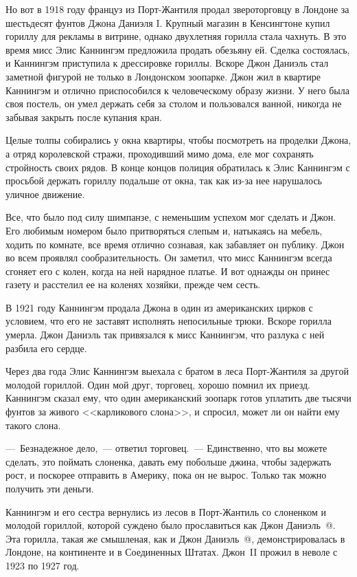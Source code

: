 \documentclass[12pt,a4paper,twoside,openany,svgnames]{memoir}
\makeatletter
\newcommand*{\rom}[1]{\expandafter\@slowromancap\romannumeral #1@}
\makeatother
\begin{document}
Но вот в 1918 году француз из Порт-Жантиля продал звероторговцу в Лондоне за шестьдесят фунтов Джона Даниэля I. Крупный магазин в Кенсингтоне купил гориллу для рекламы в витрине, однако двухлетняя горилла стала чахнуть. В это время мисс Элис Каннингэм предложила продать обезьяну ей. Сделка состоялась, и Каннингэм приступила к дрессировке гориллы. Вскоре Джон Даниэль стал заметной фигурой не только в Лондонском зоопарке. Джон жил в квартире Каннингэм и отлично приспособился к человеческому образу жизни. У него была своя постель, он умел держать себя за столом и пользовался ванной, никогда не забывая закрыть после купания кран.

Целые толпы собирались у окна квартиры, чтобы посмотреть на проделки Джона, а отряд королевской стражи, проходивший мимо дома, еле мог сохранять стройность своих рядов. В конце концов полиция обратилась к Элис Каннингэм с просьбой держать гориллу подальше от окна, так как из-за нее нарушалось уличное движение.

Все, что было под силу шимпанзе, с неменьшим успехом мог сделать и Джон. Его любимым номером было притворяться слепым и, натыкаясь на мебель, ходить по комнате, все время отлично сознавая, как забавляет он публику. Джон во всем проявлял сообразительность. Он заметил, что мисс Каннингэм всегда сгоняет его с колен, когда на ней нарядное платье. И вот однажды он принес газету и расстелил ее на коленях хозяйки, прежде чем сесть.

В 1921 году Каннингэм продала Джона в один из американских цирков с условием, что его не заставят исполнять непосильные трюки. Вскоре горилла умерла. Джон Даниэль так привязался к мисс Каннингэм, что разлука с ней разбила его сердце.

Через два года Элис Каннингэм выехала с братом в леса Порт-Жантиля за другой молодой гориллой. Один мой друг, торговец, хорошо помнил их приезд. Каннингэм сказал ему, что один американский зоопарк готов уплатить две тысячи фунтов за живого <<карликового слона>>, и спросил, может ли он найти ему такого слона.

---~Безнадежное дело,~--- ответил торговец.~--- Единственно, что вы можете сделать, это поймать слоненка, давать ему побольше джина, чтобы задержать рост, и поскорее отправить в Америку, пока он не вырос. Только так можно получить эти деньги.

Каннингэм и его сестра вернулись из лесов в Порт-Жантиль со слоненком и молодой гориллой, которой суждено было прославиться как Джон Даниэль~\rom{2}. Эта горилла, такая же смышленая, как и Джон Даниэль~\rom{1}, демонстрировалась в Лондоне, на континенте и в Соединенных Штатах. Джон~II прожил в неволе с 1923 по 1927 год.
\end{document}
